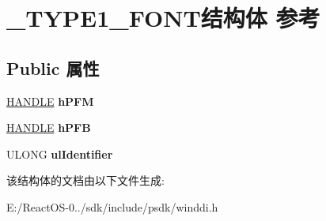 \hypertarget{struct___t_y_p_e1___f_o_n_t}{}\section{\+\_\+\+T\+Y\+P\+E1\+\_\+\+F\+O\+N\+T结构体 参考}
\label{struct___t_y_p_e1___f_o_n_t}
\subsection*{Public 属性}
\begin{DoxyCompactItemize}
\item 
\mbox{\label{struct___t_y_p_e1___f_o_n_t_ad9bf5de2c1ba9941fad6ccf0f86d31ff}} 
\hyperlink{interfacevoid}{H\+A\+N\+D\+LE} {\bfseries h\+P\+FM}
\item 
\mbox{\label{struct___t_y_p_e1___f_o_n_t_ad60826432ed013a1868261d0a929a070}} 
\hyperlink{interfacevoid}{H\+A\+N\+D\+LE} {\bfseries h\+P\+FB}
\item 
\mbox{\label{struct___t_y_p_e1___f_o_n_t_a58dbda3f3209fbc94436e25d1ddae935}} 
U\+L\+O\+NG {\bfseries ul\+Identifier}
\end{DoxyCompactItemize}


该结构体的文档由以下文件生成\+:\begin{DoxyCompactItemize}
\item 
E\+:/\+React\+O\+S-\/0../sdk/include/psdk/winddi.\+h\end{DoxyCompactItemize}
